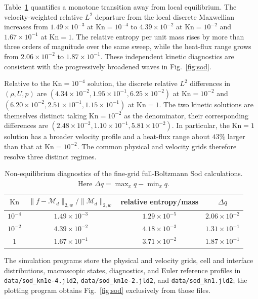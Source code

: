 \documentclass[preprint,3p,12pt]{elsarticle}
\begin{document}
Table~\ref{tab:sod-diagnostics} quantifies a monotone transition away from local equilibrium. The velocity-weighted relative $L^2$ departure from the local discrete Maxwellian increases from $1.49\times10^{-3}$ at $\mathrm{Kn}=10^{-4}$ to $4.39\times10^{-2}$ at $\mathrm{Kn}=10^{-2}$ and $1.67\times10^{-1}$ at $\mathrm{Kn}=1$. The relative entropy per unit mass rises by more than three orders of magnitude over the same sweep, while the heat-flux range grows from $2.06\times10^{-2}$ to $1.87\times10^{-1}$. These independent kinetic diagnostics are consistent with the progressively broadened waves in Fig.~\ref{fig:sod}.

Relative to the $\mathrm{Kn}=10^{-4}$ solution, the discrete relative $L^2$ differences in $(\rho,U,p)$ are $(4.34\times10^{-2},1.95\times10^{-1},6.25\times10^{-2})$ at $\mathrm{Kn}=10^{-2}$ and $(6.20\times10^{-2},2.51\times10^{-1},1.15\times10^{-1})$ at $\mathrm{Kn}=1$. The two kinetic solutions are themselves distinct: taking $\mathrm{Kn}=10^{-2}$ as the denominator, their corresponding differences are $(2.48\times10^{-2},1.10\times10^{-1},5.81\times10^{-2})$. In particular, the $\mathrm{Kn}=1$ solution has a broader velocity profile and a heat-flux range about $43\%$ larger than that at $\mathrm{Kn}=10^{-2}$. The common physical and velocity grids therefore resolve three distinct regimes.

\begin{table}[htbp]
  \centering
  \small
  \caption{Non-equilibrium diagnostics of the fine-grid full-Boltzmann Sod calculations. Here $\Delta q=\max_x q-\min_x q$.}
  \label{tab:sod-diagnostics}
  \begin{tabular}{cccc}
    \toprule
    $\mathrm{Kn}$ & $\lVert f-\mathcal{M}_d\rVert_{2,w}/\lVert\mathcal{M}_d\rVert_{2,w}$ & relative entropy/mass & $\Delta q$ \\
    \midrule
    $10^{-4}$ & $1.49\times10^{-3}$ & $1.29\times10^{-5}$ & $2.06\times10^{-2}$ \\
    $10^{-2}$ & $4.39\times10^{-2}$ & $4.18\times10^{-3}$ & $1.31\times10^{-1}$ \\
    $1$       & $1.67\times10^{-1}$ & $3.71\times10^{-2}$ & $1.87\times10^{-1}$ \\
    \bottomrule
  \end{tabular}
\end{table}

The simulation programs store the physical and velocity grids, cell and interface distributions, macroscopic states, diagnostics, and Euler reference profiles in \texttt{data/sod\_kn1e-4.jld2}, \texttt{data/sod\_kn1e-2.jld2}, and \texttt{data/sod\_kn1.jld2}; the plotting program obtains Fig.~\ref{fig:sod} exclusively from those files.
\end{document}
